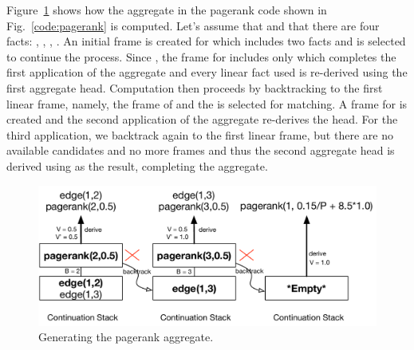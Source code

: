 \vspace{-5mm}

\vspace{-4mm}

Figure~\ref{fig:backtrack} shows how the aggregate in the pagerank code shown in
Fig.~\ref{code:pagerank} is computed. Let's assume that  and that
there are four facts: , ,
, . An initial frame is created for
 which includes two  facts and  is
selected to continue the process.  Since , the frame for
 includes only  which completes the first
application of the aggregate and every linear fact used is re-derived using the
first aggregate head. Computation then proceeds by backtracking to the first
linear frame, namely, the frame of  and the  is
selected for matching. A frame for  is created and the
second application of the aggregate re-derives the head. For the third
application, we backtrack again to the first linear frame, but there are no
available candidates and no more frames and thus the second aggregate head is
derived using  as the result, completing the aggregate.

\begin{figure}[ht]
   \begin{center}
      \includegraphics[width=0.7\linewidth]{figures/backtrack.pdf}
   \end{center}
   \caption{Generating the pagerank aggregate.}
   \label{fig:backtrack}
   \vspace{-5mm}
\end{figure}
